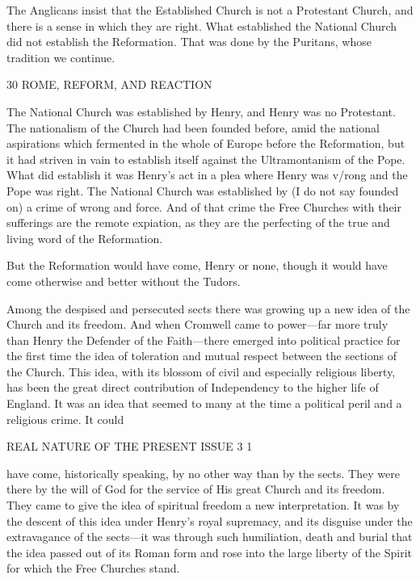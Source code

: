 \documentclass[12pt,a5paper,oneside]{book}
\begin{document}
The Anglicans insist that the Established Church is 
not a Protestant Church, and there is a sense in 
which they are right. What established the National 
Church did not establish the Reformation. That was 
done by the Puritans, whose tradition we continue. 



30 ROME, REFORM, AND REACTION 

The National Church was established by Henry, and 
Henry was no Protestant. The nationalism of the 
Church had been founded before, amid the national 
aspirations which fermented in the whole of Europe 
before the Reformation, but it had striven in vain to 
establish itself against the Ultramontanism of the Pope. 
What did establish it was Henry's act in a plea where 
Henry was v/rong and the Pope was right. The 
National Church was established by (I do not say 
founded on) a crime of wrong and force. And of that 
crime the Free Churches with their sufferings are the 
remote expiation, as they are the perfecting of the 
true and living word of the Reformation. 

But the Reformation would have come, Henry or 
none, though it would have come otherwise and better 
without the Tudors. 

Among the despised and persecuted sects there was 
growing up a new idea of the Church and its freedom. 
And when Cromwell came to power---far more truly 
than Henry the Defender of the Faith---there emerged 
into political practice for the first time the idea of 
toleration and mutual respect between the sections of 
the Church. This idea, with its blossom of civil and 
especially religious liberty, has been the great direct 
contribution of Independency to the higher life of 
England. It was an idea that seemed to many at the 
time a political peril and a religious crime. It could 



REAL NATURE OF THE PRESENT ISSUE 3 1 

have come, historically speaking, by no other way than 
by the sects. They were there by the will of God 
for the service of His great Church and its freedom. 
They came to give the idea of spiritual freedom a 
new interpretation. It was by the descent of this idea 
under Henry's royal supremacy, and its disguise under 
the extravagance of the sects---it was through such 
humiliation, death and burial that the idea passed out 
of its Roman form and rose into the large liberty of 
the Spirit for which the Free Churches stand. 
\end{document}
